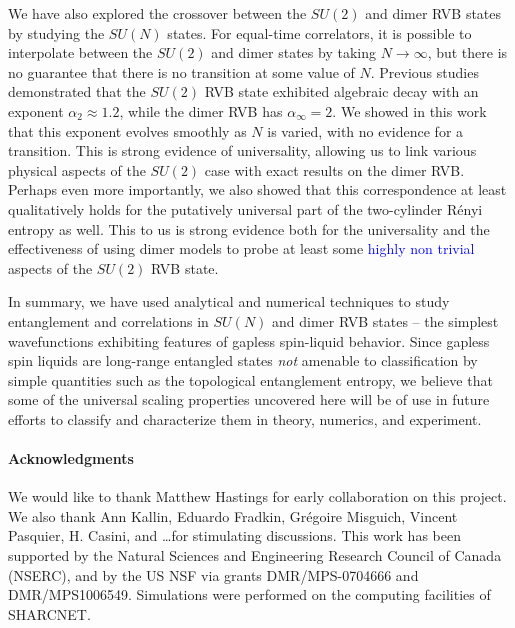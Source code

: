 \documentclass[11pt]{iopart}
\begin{document}
We have also explored the crossover between the $SU(2)$ and dimer RVB states by studying the $SU(N)$ states. For equal-time correlators, it is possible to interpolate between the $SU(2)$ and dimer states by taking $N \rightarrow \infty$, but there is no guarantee that there is no transition at some value of $N$.  Previous studies demonstrated that the $SU(2)$ RVB state exhibited algebraic decay with an exponent $\alpha_2 \approx 1.2$, while the dimer RVB has $\alpha_{\infty} = 2$.  We showed in this work that this exponent evolves smoothly as $N$ is varied, with no evidence for a transition.  
This is strong evidence of universality, allowing us to link various physical aspects of the $SU(2)$ case with exact results on the dimer RVB. Perhaps even more importantly, we also showed that this correspondence at least qualitatively holds for the putatively universal part of the two-cylinder R\'enyi entropy as well. This to us is strong evidence both for the universality and the effectiveness of using dimer models to probe at least some \textcolor{blue}{highly non trivial} aspects of the $SU(2)$ RVB state.



In summary, we have used analytical and numerical techniques to study entanglement and correlations in $SU(N)$ and dimer RVB states --  the simplest wavefunctions exhibiting features of gapless spin-liquid behavior. Since gapless spin liquids are long-range entangled states {\it not} amenable to  classification by simple quantities such as the topological entanglement entropy, we believe that some of the universal scaling properties uncovered here will be of use in future efforts to classify and characterize them in theory, numerics, and experiment.





\paragraph{Acknowledgments}
 We would like to thank Matthew Hastings for early collaboration on this project. We also thank Ann Kallin, Eduardo Fradkin, Gr\'egoire Misguich, Vincent Pasquier, H. Casini, and \ldots for stimulating discussions. This work has been supported by the Natural Sciences and Engineering
Research Council of Canada (NSERC), and by the US NSF via grants DMR/MPS-0704666 and DMR/MPS1006549.   Simulations were performed on the computing facilities of SHARCNET.
\end{document}
